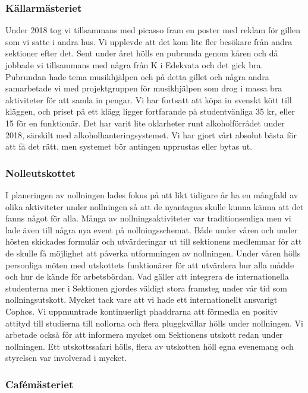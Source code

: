 \documentclass[../_main/handlingar.tex]{subfiles}
\begin{document}
\subsubsection*{Källarmästeriet}

Under 2018 tog vi tillsammans med picasso fram en poster med reklam för gillen som vi satte i andra
hus. Vi upplevde att det kom lite fler besökare från andra sektioner efter det. Sent under året hölls
en pubrunda genom kåren och då jobbade vi tillsammans med några från K i Edekvata och det gick
bra. Pubrundan hade tema musikhjälpen och på detta gillet och några andra samarbetade vi med
projektgruppen för musikhjälpen som drog i massa bra aktiviteter för att samla in pengar.
Vi har fortsatt att köpa in svenskt kött till kläggen, och priset på ett klägg ligger fortfarande på
studentvänliga 35 kr, eller 15 för en funktionär.
Det har varit lite oklarheter runt alkoholförrådet under 2018, särskilt med alkoholhanteringsystemet.
Vi har gjort vårt absolut bästa för att få det rätt, men systemet bör antingen upprustas eller bytas ut.


\subsubsection*{Nolleutskottet}

I planeringen av nollningen lades fokus på att likt tidigare år ha en mångfald av olika aktiviteter under
nollningen så att de nyantagna skulle kunna känna att det fanns något för alla. Många av
nollningsaktiviteter var traditionsenliga men vi lade även till några nya event på nollningsschemat.
Både under våren och under hösten skickades formulär och utvärderingar ut till sektionens
medlemmar för att de skulle få möjlighet att påverka utformningen av nollningen. Under våren hölls
personliga möten med utskottets funktionärer för att utvärdera hur alla mådde och hur de kände för
arbetsbördan.
Vad gäller att integrera de internationella studenterna mer i Sektionen gjordes väldigt stora framsteg
under vår tid som nollningsutskott. Mycket tack vare att vi hade ett internationellt ansvarigt Cophøs.
Vi uppmuntrade kontinuerligt phaddrarna att förmedla en positiv attityd till studierna till nollorna
och flera pluggkvällar hölls under nollningen. Vi arbetade också för att informera mycket om
Sektionens utskott redan under nollningen. Ett utskottssafari hölls, flera av utskotten höll egna
evenemang och styrelsen var involverad i mycket.



\subsubsection*{Cafémästeriet}
\end{document}
